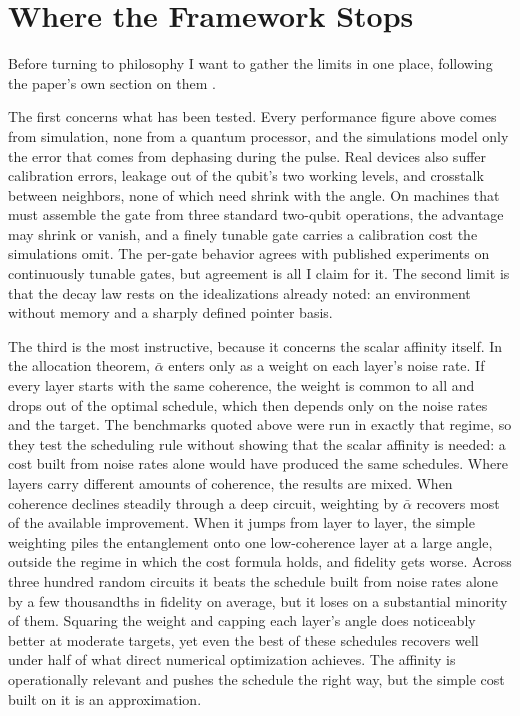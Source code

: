\section{Where the Framework Stops}
\label{sec:ch13-limits}

Before turning to philosophy I want to gather the limits in one place, following the paper's own section on them \citep{AdamsRCT}.

The first concerns what has been tested. Every performance figure above comes from simulation, none from a quantum processor, and the simulations model only the error that comes from dephasing during the pulse. Real devices also suffer calibration errors, leakage out of the qubit's two working levels, and crosstalk between neighbors, none of which need shrink with the angle. On machines that must assemble the gate from three standard two-qubit operations, the advantage may shrink or vanish, and a finely tunable gate carries a calibration cost the simulations omit. The per-gate behavior agrees with published experiments on continuously tunable gates, but agreement is all I claim for it. The second limit is that the decay law rests on the idealizations already noted: an environment without memory and a sharply defined pointer basis.

The third is the most instructive, because it concerns the scalar affinity itself. In the allocation theorem, $\bar{\alpha}$ enters only as a weight on each layer's noise rate. If every layer starts with the same coherence, the weight is common to all and drops out of the optimal schedule, which then depends only on the noise rates and the target. The benchmarks quoted above were run in exactly that regime, so they test the scheduling rule without showing that the scalar affinity is needed: a cost built from noise rates alone would have produced the same schedules. Where layers carry different amounts of coherence, the results are mixed. When coherence declines steadily through a deep circuit, weighting by $\bar{\alpha}$ recovers most of the available improvement. When it jumps from layer to layer, the simple weighting piles the entanglement onto one low-coherence layer at a large angle, outside the regime in which the cost formula holds, and fidelity gets worse. Across three hundred random circuits it beats the schedule built from noise rates alone by a few thousandths in fidelity on average, but it loses on a substantial minority of them. Squaring the weight and capping each layer's angle does noticeably better at moderate targets, yet even the best of these schedules recovers well under half of what direct numerical optimization achieves. The affinity is operationally relevant and pushes the schedule the right way, but the simple cost built on it is an approximation.

